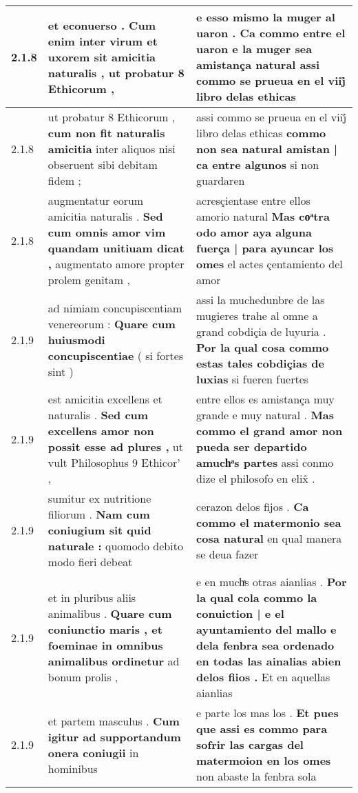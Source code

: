 \begin{tabular}{|p{1cm}|p{6.5cm}|p{6.5cm}|}
2.1.8 & et econuerso . \textbf{ Cum enim inter virum et uxorem sit amicitia naturalis , } ut probatur 8 Ethicorum , & e esso mismo la muger al uaron . \textbf{ Ca commo entre el uaron e la muger sea amistança natural } assi commo se prueua en el viij̊ libro delas ethicas \\\hline
2.1.8 & ut probatur 8 Ethicorum , \textbf{ cum non fit naturalis amicitia } inter aliquos nisi obseruent sibi debitam fidem ; & assi commo se prueua en el viij̊ libro delas ethicas \textbf{ commo non sea natural amistan | ca entre algunos } si non guardaren \\\hline
2.1.8 & augmentatur eorum amicitia naturalis . \textbf{ Sed cum omnis amor vim quandam unitiuam dicat , } augmentato amore propter prolem genitam , & acresçientase entre ellos amorio natural \textbf{ Mas coͣtra odo amor aya alguna fuerça | para ayuncar los omes } el actes çentamiento del amor \\\hline
2.1.9 & ad nimiam concupiscentiam venereorum : \textbf{ Quare cum huiusmodi concupiscentiae } ( si fortes sint ) & assi la muchedunbre de las mugieres trahe al omne a grand cobdiçia de luyuria . \textbf{ Por la qual cosa commo estas tales cobdiçias de luxias } si fueren fuertes \\\hline
2.1.9 & est amicitia excellens et naturalis . \textbf{ Sed cum excellens amor non possit esse ad plures , } ut vult Philosophus 9 Ethicor’ , & entre ellos es amistança muy grande e muy natural . \textbf{ Mas commo el grand amor non pueda ser departido amuchͣs partes } assi conmo dize el philosofo en elix̊ . \\\hline
2.1.9 & sumitur ex nutritione filiorum . \textbf{ Nam cum coniugium sit quid naturale : } quomodo debito modo fieri debeat & cerazon delos fijos . \textbf{ Ca commo el matermonio sea cosa natural } en qual manera se deua fazer \\\hline
2.1.9 & et in pluribus aliis animalibus . \textbf{ Quare cum coniunctio maris , et foeminae in omnibus animalibus ordinetur } ad bonum prolis , & e en muchͣs otras aianlias . \textbf{ Por la qual cola commo la conuiction | e el ayuntamiento del mallo e dela fenbra sea ordenado en todas las ainalias abien delos fiios . } Et en aquellas aianlias \\\hline
2.1.9 & et partem masculus . \textbf{ Cum igitur ad supportandum onera coniugii } in hominibus & e parte los mas los . \textbf{ Et pues que assi es commo para sofrir las cargas del matermoion en los omes } non abaste la fenbra sola \\\hline

\end{tabular}
